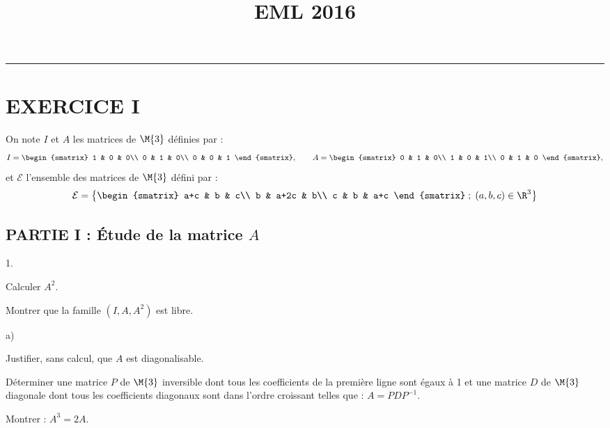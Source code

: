 \documentclass[11pt]{article}%
\title{\bf \vspace{-1.6cm} EML 2016} %
\author{} %
\date{} %
\begin{document}
\maketitle %
\vspace{-1.2cm}\hrule %
\thispagestyle{fancy}

\vspace*{.4cm}


\section*{EXERCICE I}

\noindent
On note $I$ et $A$ les matrices de $\M{3}$ définies 
par :
\[
I=
\begin{smatrix}
 1 & 0 & 0\\
 0 & 1 & 0\\
 0 & 0 & 1
\end{smatrix}
, \qquad 
A=
\begin{smatrix}
 0 & 1 & 0\\
 1 & 0 & 1\\
 0 & 1 & 0
\end{smatrix},
\]
et $\mathcal{E}$ l'ensemble des matrices de $\M{3}$ 
défini par :
\[
\mathcal{E}=\left\{
\begin{smatrix}
 a+c & b & c\\
 b & a+2c & b\\
 c & b & a+c
\end{smatrix} \; ; \; (a,b,c) \in \R^3 \right\}
\]

\subsection*{PARTIE I : Étude de la matrice $A$}

\begin{noliste}{1.}
\setlength{\itemsep}{2mm}
\item Calculer $A^2$.




\item Montrer que la famille $(I,A,A^2)$ est libre.




\item
\begin{noliste}{a)}
\item Justifier, sans calcul, que $A$ est diagonalisable.



\item Déterminer une matrice $P$ de $\M{3}$ 
inversible dont tous les coefficients de la première ligne sont égaux à 
1 et une matrice $D$ de $\M{3}$ diagonale dont tous 
les coefficients diagonaux sont dans l'ordre croissant telles que : 
$A=PDP^{-1}$.


\end{noliste}

\item Montrer : $A^3=2A$.


\end{noliste}
\end{document}

